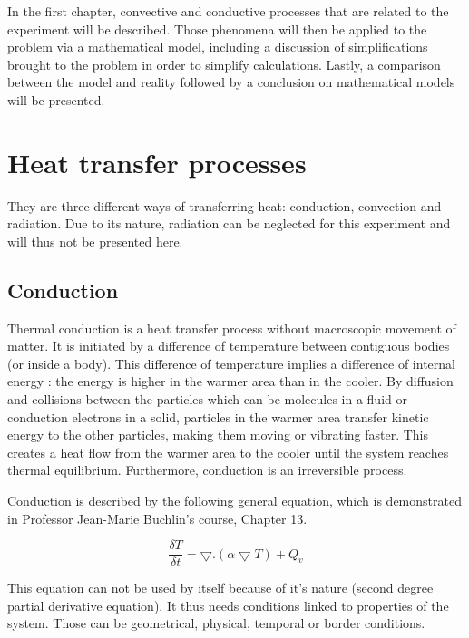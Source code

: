 \documentclass{report}
\begin{document}
	In the first chapter, convective and conductive processes that are related to the experiment will be described. Those phenomena will then be applied to the problem via a mathematical model, including a discussion of simplifications brought to the problem in order to simplify calculations. Lastly, a comparison between the model and reality followed by a conclusion on mathematical models will be presented.
	
	\chapter{Heat transfer processes}\label{htp}
	
	They are three different ways of transferring heat: conduction, convection and radiation. Due to its nature, radiation can be neglected for this experiment and will thus not be presented here.
	
	\section{Conduction}\label{cd}
	
	Thermal conduction is a heat transfer process without macroscopic movement of matter. It is initiated by a difference of temperature between contiguous bodies (or inside a body). This difference of temperature implies a difference of internal energy : the energy is higher in the warmer area than in the cooler. By diffusion and collisions between the particles which can be molecules in a fluid or conduction electrons in a solid, particles in the warmer area transfer kinetic energy to the other particles, making them moving or vibrating faster. This creates a heat flow from the warmer area to the cooler until the system reaches thermal equilibrium. Furthermore, conduction is an irreversible process.
	
	Conduction is described by the following general equation, which is demonstrated in Professor Jean-Marie Buchlin's course\cite{Buchlin}, Chapter 13.
	
	\begin{equation}
		\frac{\delta T}{\delta t} = \bigtriangledown . (\alpha \bigtriangledown T)+ \dot{Q}_v
	\end{equation}
	
	This equation can not be used by itself because of it's nature (second degree partial derivative equation). It thus needs conditions linked to properties of the system. Those can be geometrical, physical, temporal or border conditions.
	
\end{document}
